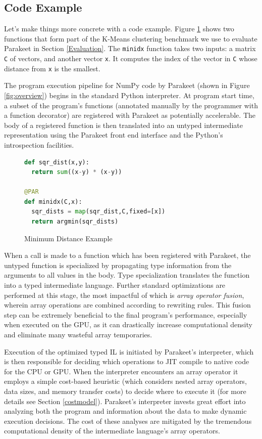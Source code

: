 \documentclass[10pt,twocolumn]{article}
\begin{document}
\subsection{Code Example}
Let's make things more concrete with a code example.  Figure \ref{MinIdx} shows two functions that form part of the K-Means clustering benchmark we use to evaluate Parakeet in Section \ref{Evaluation}.  The \texttt{minidx} function takes two inputs: a matrix \texttt{C} of vectors, and another vector \texttt{x}.  It computes the index of the vector in \texttt{C} whose distance from \texttt{x} is the smallest.

The program execution pipeline for NumPy code by Parakeet (shown in Figure \ref{fig:overview}) begins in the standard Python interpreter. At program start time, a subset of the program's functions (annotated manually by the programmer with a function decorator) are registered with Parakeet as potentially accelerable. The body of a registered function is then translated into an untyped intermediate representation using the Parakeet front end interface and the Python's introspection facilities.

\begin{figure}[h!]
\begin{lstlisting}[numbers=none,language=Python,frame=single]
def sqr_dist(x,y):
  return sum((x-y) * (x-y))

@PAR
def minidx(C,x):
  sqr_dists = map(sqr_dist,C,fixed=[x])
  return argmin(sqr_dists)
\end{lstlisting}
\caption{Minimum Distance Example}
\label{MinIdx}
\end{figure}

When a call is made to a function which has been registered with Parakeet, the untyped function is specialized by propagating type information from the arguments to all values in the body.  Type specialization translates the function into a typed intermediate language. Further standard optimizations are performed at this stage, the most impactful of which is \emph{array operator fusion}, wherein array operations are combined according to rewriting rules. This fusion step can be extremely beneficial to the final program's performance, especially when executed on the GPU, as it can drastically increase computational density and eliminate many wasteful array temporaries.

Execution of the optimized typed IL is initiated by Parakeet's interpreter, which is then responsible for deciding which operations to JIT compile to native code for the CPU or GPU. When the interpreter encounters an array operator it employs a simple cost-based heuristic (which considers nested array operators, data sizes, and memory transfer costs) to decide where to execute it (for more details see Section \ref{costmodel}). Parakeet's interpreter invests great effort into analyzing both the program and information about the data to make dynamic execution decisions. The cost of these analyses are mitigated by the tremendous computational density of the intermediate language's array operators.
\end{document}
